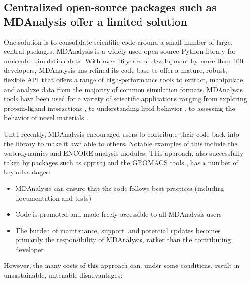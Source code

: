 \documentclass[9pt,whitepaper]{livecoms}
\begin{document}
\subsection{Centralized open-source packages such as MDAnalysis offer a limited solution}
\label{sec:centralization}

One solution is to consolidate scientific code around a small number of large, central packages. MDAnalysis is a widely-used open-source Python library for molecular simulation data. With over 16 years of development by more than 160 developers, MDAnalysis has refined its code base to offer a mature, robust, flexible API that offers a range of high-performance tools to extract, manipulate, and analyze data from the majority of common simulation formats. MDAnalysis tools have been used for a variety of scientific applications ranging from exploring protein-ligand interactions \cite{alibay_ialibaymdrestraintsgenerator_2021, kokh_workflow_2020, bouysset_prolif_2021}, to understanding lipid behavior \cite{wilson_investigating_2021, smith_lipyphilic_2021}, to assessing the behavior of novel materials \cite{gowers_kugupukugupu_2021, loche_maicos_2022}. 

Until recently, MDAnalysis encouraged users to contribute their code back into the library to make it available to others. Notable examples of this include the waterdynamics \cite{araya-secchi_characterization_2014} and ENCORE \cite{tiberti_encore_2015} analysis modules. This approach, also successfully taken by packages such as cpptraj \cite{roe_ptraj_2013} and the GROMACS tools \cite{abraham_gromacs_2015}, has a number of key advantages:
\begin{itemize}
    \item MDAnalysis can ensure that the code follows best practices (including documentation and tests)
    \item Code is promoted and made freely accessible to all MDAnalysis users
    \item The burden of maintenance, support, and potential updates becomes primarily the responsibility of MDAnalysis, rather than the contributing developer
\end{itemize}

However, the many costs of this approach can, under some conditions, result in unsustainable, untenable disadvantages:
\end{document}
